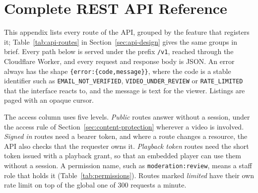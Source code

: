 \chapter{Complete REST API Reference}
\label{app:api}

This appendix lists every route of the API, grouped by the feature that registers it; Table~\ref{tab:api-routes}
in Section~\ref{sec:api-design} gives the same groups in brief. Every path below is served under the prefix
\texttt{/v1}, reached through the Cloudflare Worker, and every request and response body is JSON. An error
always has the shape \texttt{\{error:\{code,message\}\}}, where the code is a stable identifier such as
\texttt{EMAIL\_NOT\_VERIFIED}, \texttt{VIDEO\_UNDER\_REVIEW} or \texttt{RATE\_LIMITED} that the interface
reacts to, and the message is text for the viewer. Listings are paged with an opaque cursor.

The access column uses five levels. \textit{Public} routes answer without a session, under the access rule
of Section~\ref{sec:content-protection} wherever a video is involved. \textit{Signed in} routes need a bearer
token, and where a route changes a resource, the API also checks that the requester owns it.
\textit{Playback token} routes need the short token issued with a playback grant, so that an embedded player
can use them without a session. A permission name, such as \texttt{moderation:review}, means a staff role
that holds it (Table~\ref{tab:permissions}). Routes marked \textit{limited} have their own rate limit on top of
the global one of 300 requests a minute.

